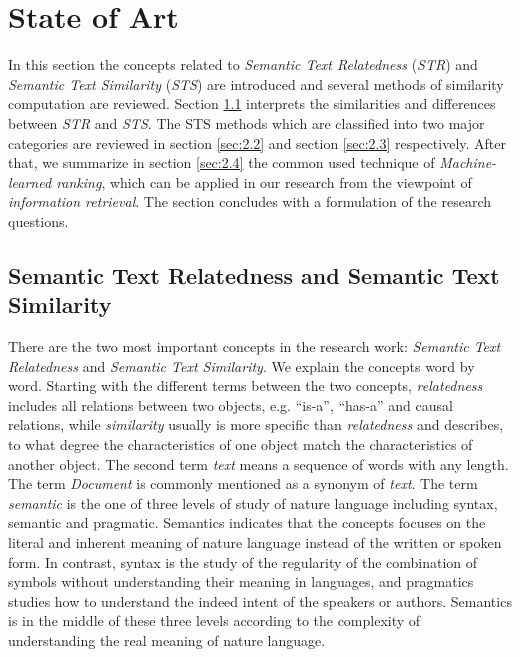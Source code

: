 \section{State of Art}
\label{sec:2}

In this section the concepts related to \textit{Semantic Text Relatedness} (\textit{STR}) and \textit{Semantic Text Similarity} (\textit{STS}) are introduced and several methods of similarity computation are reviewed. Section \ref{sec:2.1} interprets the similarities and differences between \textit{STR} and \textit{STS}. The STS methods which are classified into two major categories are reviewed in section \ref{sec:2.2} and section \ref{sec:2.3} respectively. After that, we summarize in section \ref{sec:2.4} the common used technique of \textit{Machine-learned ranking}, which can be applied in our research from the viewpoint of \textit{information retrieval}. The section concludes with a formulation of the research questions. 


\subsection{Semantic Text Relatedness and Semantic Text Similarity}
\label{sec:2.1}

There are the two most important concepts in the research work: \textit{Semantic Text Relatedness} and \textit{Semantic Text Similarity}. We explain the concepts word by word. Starting with the different terms between the two concepts, \textit{relatedness} includes all relations between two objects, e.g. ``is-a'', ``has-a'' and causal relations, while \textit{similarity} usually is more specific than \textit{relatedness} and describes, to what degree the characteristics of one object match the characteristics of another object. The second term \textit{text} means a sequence of words with any length. The term \textit{Document} is commonly mentioned as a synonym of \textit{text}. The term \textit{semantic} is the one of three levels of study of nature language including syntax, semantic and pragmatic. Semantics indicates that the concepts focuses on the literal and inherent meaning of nature language instead of the written or spoken form. In contrast, syntax is the study of the regularity of the combination of symbols without understanding their meaning in languages, and pragmatics studies how to understand the indeed intent of the speakers or authors. Semantics is in the middle of these three levels according to the complexity of understanding the real meaning of nature language. 

